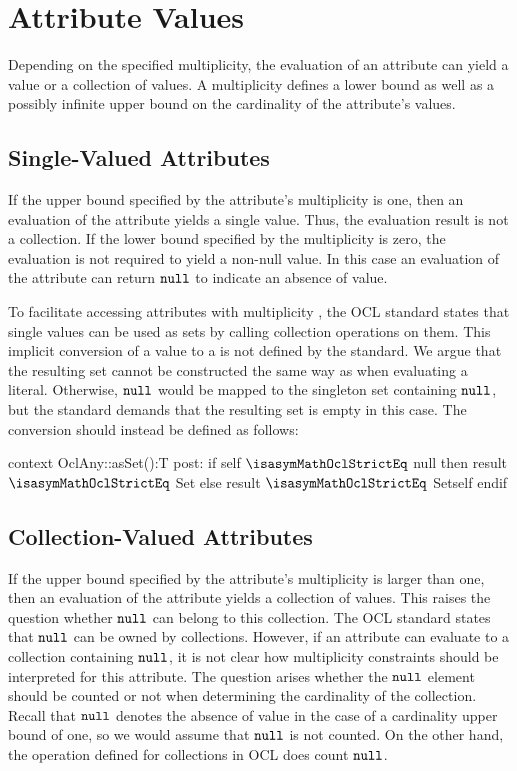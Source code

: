 \section{Attribute Values}\label{sec:multiplicities}
Depending on the specified multiplicity, the evaluation of an attribute can
yield a value or a collection of values. A multiplicity defines a lower bound as
well as a possibly infinite upper bound on the cardinality of the attribute's
values.

\subsection{Single-Valued Attributes}\label{subsec:single-valued-properties}
If the upper bound specified by the attribute's multiplicity is one, then an
evaluation of the attribute yields a single value. Thus, the evaluation result
is not a collection. If the lower bound specified by the multiplicity is zero,
the evaluation is not required to yield a non-null value. In this case an
evaluation of the attribute can return $\mathtt{null}$ to indicate an
absence of value.

To facilitate accessing attributes with multiplicity , the OCL
standard states that single values can be used as sets by calling collection
operations on them. This implicit conversion of a value to a
 is not defined by the standard. We argue that the resulting set
cannot be constructed the same way as when evaluating a 
literal. Otherwise, $\mathtt{null}$ would be mapped to the singleton set
containing $\mathtt{null}$, but the standard demands that
the resulting set is empty in this case. The conversion should instead
be defined as follows:
\begin{ocl}
context OclAny::asSet():T
  post: if self $\isasymMathOclStrictEq$ null then result $\isasymMathOclStrictEq$ Set{}
        else result $\isasymMathOclStrictEq$ Set{self} endif
\end{ocl}

\subsection{Collection-Valued Attributes}\label{subsec:collection-valued-properties}
If the upper bound specified by the attribute's multiplicity is larger than one,
then an evaluation of the attribute yields a collection of values.  This raises
the question whether $\mathtt{null}$ can belong to this collection. The OCL
standard states that $\mathtt{null}$ can be owned by collections. However, if
an attribute can evaluate to a collection containing $\mathtt{null}$, it is not
clear how multiplicity constraints should be interpreted for this attribute. The
question arises whether the $\mathtt{null}$ element should be counted or not
when determining the cardinality of the collection. Recall that $\mathtt{null}$
denotes the absence of value in the case of a cardinality upper bound of one, so
we would assume that $\mathtt{null}$ is not counted. On the other hand, the
operation  defined for collections in OCL does count
$\mathtt{null}$.

